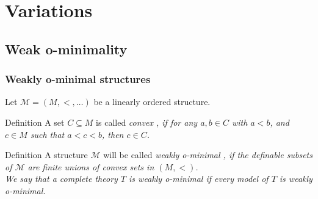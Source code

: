 
\section{Variations}
\subsection{Weak o-minimality}

\begin{frame}[c]\frametitle{Weakly o-minimal structures}
	
	Let $\mathcal{M} = (M,<, \dots )$ be a linearly ordered structure.
    
	\begin{beamerboxesrounded}[shadow=true]{Definition}
		A set $C \subseteq M$ is called \em convex \em, if for any $a,b \in C$ with $a<b$, and $c\in M$ such that $a<c<b$, then $c \in C$. 
	\end{beamerboxesrounded}

	\begin{beamerboxesrounded}[shadow=true]{Definition}
		A structure $\mathcal{M}$ will be called \em weakly o-minimal \em, if the definable subsets of $\mathcal{M}$ are finite unions of convex sets in $(M,<)$.\\
		We say that a complete theory $T$ is \em weakly o-minimal \em if every model of $T$ is weakly o-minimal. 
	\end{beamerboxesrounded}

\end{frame}